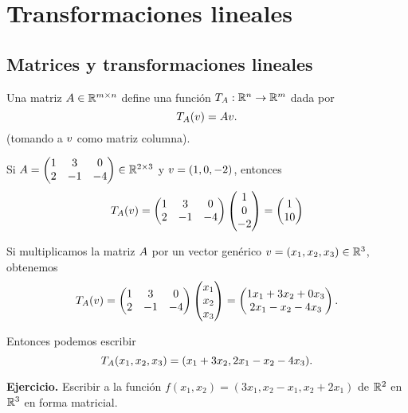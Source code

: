 \section{Transformaciones lineales}

\subsection{Matrices y transformaciones lineales}

Una matriz $\Ab \in \R^{m \times n}$ define una funci\'on $T_{\Ab}: \mathbb{R}^n \rightarrow \mathbb{R}^m$ dada por
$$
T_{\Ab}(\vb) = \Ab\vb.
$$
(tomando a $\vb$ como matriz columna).

\begin{ejemplo}
Si $\Ab = \begin{pmatrix} 1 & 3 & 0 \\ 2 & -1 & -4\end{pmatrix} \in \mathbb{R}^{2 \times 3}$ y $\vb = (1, 0, -2)$, entonces $$
T_{\Ab}(\vb) = \begin{pmatrix} 1 & 3 & 0 \\ 2 & -1 & -4\end{pmatrix} \begin{pmatrix} 1 \\ 0 \\ -2\end{pmatrix} = \begin{pmatrix} 1 \\ 10 \end{pmatrix}
$$

Si multiplicamos la matriz $\Ab$ por un vector genérico $\vb = (x_1, x_2, x_3) \in \R^3$, obtenemos
$$
T_{\Ab}(\vb) = \begin{pmatrix} 1 & 3 & 0 \\ 2 & -1 & -4\end{pmatrix} \begin{pmatrix} x_1 \\ x_2 \\ x_3\end{pmatrix} = \begin{pmatrix} 1 x_1 + 3 x_2 + 0x_3 \\ 2 x_1 - x_2 - 4x_3 \end{pmatrix}.
$$

Entonces podemos escribir $$
T_{\Ab}(x_1, x_2, x_3) = (x_1 + 3x_2, 2x_1-x_2 - 4x_3).
$$
\end{ejemplo}

\textbf{Ejercicio.} Escribir a la función $f(x_1, x_2) = (3x_1, x_2 - x_1, x_2 + 2x_1)$ de $\mathbb R^2$ en $\mathbb R^3$ en forma matricial.

